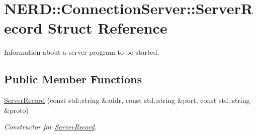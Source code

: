 \hypertarget{structNERD_1_1ConnectionServer_1_1ServerRecord}{
\section{\-N\-E\-R\-D\-:\-:\-Connection\-Server\-:\-:\-Server\-Record \-Struct \-Reference}
\label{structNERD_1_1ConnectionServer_1_1ServerRecord}
}


\-Information about a server program to be started.  


\subsection*{\-Public \-Member \-Functions}
\begin{DoxyCompactItemize}
\item 
\hyperlink{structNERD_1_1ConnectionServer_1_1ServerRecord_a787396107afcb77da909db0fab301d9e}{\-Server\-Record} (const std\-::string \&addr, const std\-::string \&port, const std\-::string \&proto)
\begin{DoxyCompactList}\small\item\em \-Constructor for \hyperlink{structNERD_1_1ConnectionServer_1_1ServerRecord}{\-Server\-Record}. \end{DoxyCompactList}\end{DoxyCompactItemize}

